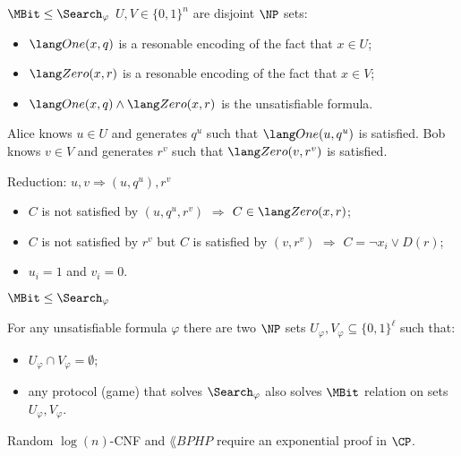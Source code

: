 \begin{frame}{$\MBit \le \Search_{\varphi}$}
    $U, V \in \{0, 1\}^n$ are disjoint $\NP$ sets:
    \begin{itemize}
        \item $\One(x, q)$ is a resonable encoding of the fact that $x \in U$;
        \item $\Zero(x, r)$ is a resonable encoding of the fact that $x \in V$;
        \item $\One(x, q) \land \Zero(x, r)$ is the unsatisfiable formula.            
    \end{itemize}

    \vspace{0.2cm}
    \pause
    Alice knows $u \in U$ and generates $q^u$ such that $\One(u, q^u)$ is satisfied. Bob knows $v \in
    V$ and generates $r^v$ such that $\Zero(v, r^v)$ is satisfied.

    \vspace{0.2cm}
    Reduction: $u, v \Rightarrow (u, q^u), r^v$ 

	\pause
    
    \begin{itemize}
        \item $C$ is not satisfied by $(u, q^u, r^v)$ $\Rightarrow$ $C \in \Zero(x, r)$;
        \pause
        \item $C$ is not satisfied by $r^v$ but $C$ is satisfied by $(v, r^v)$ $\Rightarrow$ $C = \neg
            x_i \lor D(r)$;
        \pause
        \item $u_i = 1$ and $v_i = 0$.   
    \end{itemize}
\end{frame}


\begin{frame}{$\MBit \le \Search_{\varphi}$}

    \begin{theorem}
        For any unsatisfiable formula $\varphi$ there are two $\NP$ sets $U_{\varphi}, V_{\varphi}
        \subseteq \{0, 1\}^{\ell}$ such that:
        \begin{itemize}
            \item $U_{\varphi} \cap V_{\varphi} = \emptyset$;
            \item any protocol (game) that solves $\Search_{\varphi}$ also solves $\MBit$ relation on
                sets $U_{\varphi}, V_{\varphi}$.
        \end{itemize}
    \end{theorem}

    \begin{corollary}
        Random $\log(n)$-CNF and $\lang{BPHP}$ require an exponential proof in $\CP$.
    \end{corollary}
\end{frame}


